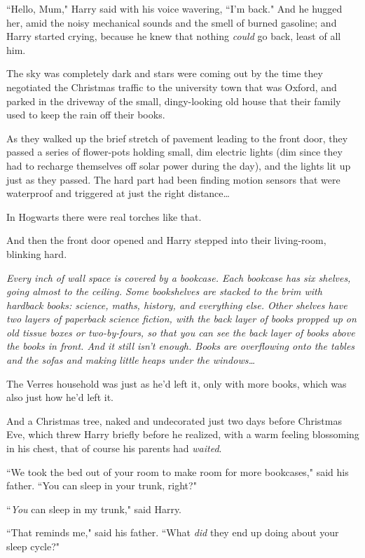 ``Hello, Mum," Harry said with his voice wavering, ``I'm back." And he hugged her, amid the noisy mechanical sounds and the smell of burned gasoline; and Harry started crying, because he knew that nothing \emph{could} go back, least of all him.

\later

The sky was completely dark and stars were coming out by the time they negotiated the Christmas traffic to the university town that was Oxford, and parked in the driveway of the small, dingy-looking old house that their family used to keep the rain off their books.

As they walked up the brief stretch of pavement leading to the front door, they passed a series of flower-pots holding small, dim electric lights (dim since they had to recharge themselves off solar power during the day), and the lights lit up just as they passed. The hard part had been finding motion sensors that were waterproof and triggered at just the right distance…

In Hogwarts there were real torches like that.

And then the front door opened and Harry stepped into their living-room, blinking hard.

\emph{Every inch of wall space is covered by a bookcase. Each bookcase has six shelves, going almost to the ceiling. Some bookshelves are stacked to the brim with hardback books: science, maths, history, and everything else. Other shelves have two layers of paperback science fiction, with the back layer of books propped up on old tissue boxes or two-by-fours, so that you can see the back layer of books above the books in front. And it still isn't enough. Books are overflowing onto the tables and the sofas and making little heaps under the windows…}

The Verres household was just as he'd left it, only with more books, which was also just how he'd left it.

And a Christmas tree, naked and undecorated just two days before Christmas Eve, which threw Harry briefly before he realized, with a warm feeling blossoming in his chest, that of course his parents had \emph{waited}.

``We took the bed out of your room to make room for more bookcases," said his father. ``You can sleep in your trunk, right?"

``\emph{You} can sleep in my trunk," said Harry.

``That reminds me," said his father. ``What \emph{did} they end up doing about your sleep cycle?"

